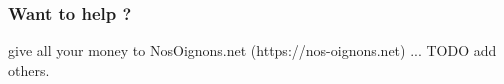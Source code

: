 \begin{frame}

\end{frame}

\begin{frame}
\frametitle{Want to help ?}
give all your money to NosOignons.net (https://nos-oignons.net)
... TODO add others.
\end{frame}


